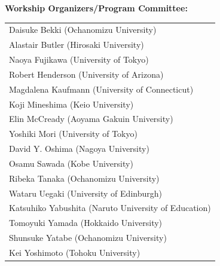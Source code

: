 \documentclass[12pt]{jarticle}
\begin{document}
\begin{center}
{\large \textbf{Workship Organizers/Program Committee:}} \\
\vspace*{1cm}
\begin{tabular}{l}
Daisuke Bekki (Ochanomizu University) \\
Alastair Butler (Hirosaki University) \\
Naoya Fujikawa (University of Tokyo) \\
Robert Henderson (University of Arizona) \\
Magdalena Kaufmann (University of Connecticut) \\
Koji Mineshima (Keio University) \\
Elin McCready (Aoyama Gakuin University) \\
Yoshiki Mori (University of Tokyo) \\
David Y. Oshima (Nagoya University) \\
Osamu Sawada (Kobe University) \\
Ribeka Tanaka (Ochanomizu University) \\
Wataru Uegaki (University of Edinburgh) \\
Katsuhiko Yabushita (Naruto University of Education) \\
Tomoyuki Yamada (Hokkaido University) \\
Shunsuke Yatabe (Ochanomizu University) \\
Kei Yoshimoto (Tohoku University) \\

\end{tabular}
\end{center}
\newpage
  
  
\end{document}
